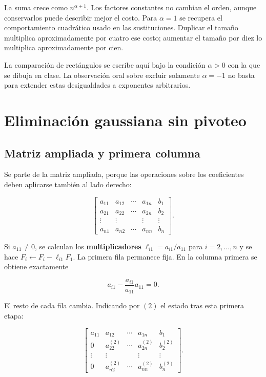 \documentclass[12pt,a4paper]{article}
\begin{document}

La suma crece como $n^{\alpha+1}$. Los factores constantes no cambian el orden, aunque conservarlos puede describir mejor el costo. Para $\alpha=1$ se recupera el comportamiento cuadrático usado en las sustituciones. Duplicar el tamaño multiplica aproximadamente por cuatro ese costo; aumentar el tamaño por diez lo multiplica aproximadamente por cien.

\begin{notebox}
La comparación de rectángulos se escribe aquí bajo la condición $\alpha>0$ con la que se dibuja en clase. La observación oral sobre excluir solamente $\alpha=-1$ no basta para extender estas desigualdades a exponentes arbitrarios.
\end{notebox}

\section{Eliminación gaussiana sin pivoteo}

\subsection{Matriz ampliada y primera columna}

Se parte de la matriz ampliada, porque las operaciones sobre los coeficientes deben aplicarse también al lado derecho:

\[
\left[\begin{array}{cccc|c}
a_{11}&a_{12}&\cdots&a_{1n}&b_1\\
a_{21}&a_{22}&\cdots&a_{2n}&b_2\\
\vdots&\vdots&&\vdots&\vdots\\
a_{n1}&a_{n2}&\cdots&a_{nn}&b_n
\end{array}\right].
\]

Si $a_{11}\ne0$, se calculan los \textbf{multiplicadores} $\ell_{i1}=a_{i1}/a_{11}$ para $i=2,\ldots,n$ y se hace $F_i\leftarrow F_i-\ell_{i1}F_1$. La primera fila permanece fija. En la columna primera se obtiene exactamente

\[
a_{i1}-\frac{a_{i1}}{a_{11}}a_{11}=0.
\]

El resto de cada fila cambia. Indicando por $(2)$ el estado tras esta primera etapa:

\[
\left[\begin{array}{cccc|c}
a_{11}&a_{12}&\cdots&a_{1n}&b_1\\
0&a_{22}^{(2)}&\cdots&a_{2n}^{(2)}&b_2^{(2)}\\
\vdots&\vdots&&\vdots&\vdots\\
0&a_{n2}^{(2)}&\cdots&a_{nn}^{(2)}&b_n^{(2)}
\end{array}\right].
\]
\end{document}
